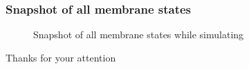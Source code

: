     \begin{frame}[t]\frametitle{Snapshot of all membrane states}
      \begin{figure}
        \def\svgwidth{\textwidth}
        
        \caption{Snapshot of all membrane states while simulating}
        \label{fig:snapshot_of_all_membrane_states_while_simulating}
      \end{figure}
    \end{frame}
    \note{}



\begin{frame}[plain]
  \begin{center}
    Thanks for your attention
  \end{center}
\end{frame}

\newsavebox\mytempbib
\savebox\mytempbib{\parbox{\textwidth}{}}

